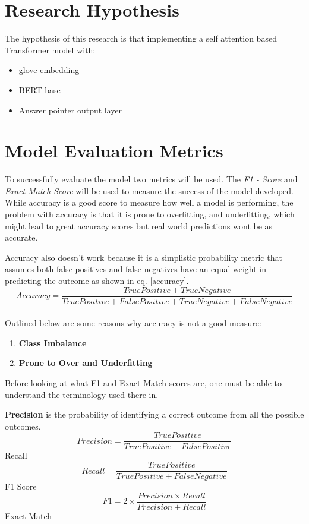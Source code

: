 \documentclass[a4paper,12pt]{report}
\begin{document}
    \section{Research Hypothesis}\label{c33}
    The hypothesis of this research is that implementing a self attention based Transformer model with:
    \begin{itemize}
    	\item glove embedding
    	\item BERT base\citep{bert}
    	\item Answer pointer output layer\citep{lstmPointer, lstmhu2016question}

    \end{itemize}
	\section{Model Evaluation Metrics}\label{33}

		To successfully evaluate the model two metrics will be used. The \textit{F1 - Score} and \textit{Exact Match Score} will be used to measure the success of the model developed. While accuracy is a good score to measure how well a model is performing, the problem with accuracy is that it is prone to overfitting, and underfitting, which might lead to great accuracy scores but real world predictions wont be as accurate.

		Accuracy also doesn't work because it is a simplistic probability metric that assumes both false positives and false negatives have an equal weight in predicting the outcome as shown in eq. \ref{accuracy}.
				\begin{equation}\label{accuracy}
			Accuracy = \dfrac{True Positive +  True Negative}{True Positive +  False Positive + True Negative +  False Negative}
		\end{equation}
	\\
		Outlined below are some reasons why accuracy is not a good measure:
		\begin{enumerate}
			\item \textbf{Class Imbalance}
			\item \textbf{Prone to Over and Underfitting}
		\end{enumerate}

	Before looking at what F1 and Exact Match scores are, one must be able to understand the terminology used there in.

	\textbf{Precision} is the probability of identifying a correct outcome from all the possible outcomes.
	\begin{equation}\label{precision}
		Precision = \dfrac{True Positive}{True Positive +  False Positive }
	\end{equation}
	Recall
		\begin{equation}\label{recall}
		Recall = \dfrac{True Positive}{True Positive +  False Negative }
	\end{equation}
	F1 Score
		\begin{equation}\label{f1}
		F1 = 2 \times \dfrac{Precision \times Recall}{Precision + Recall}
	\end{equation}
	Exact Match
\end{document}
